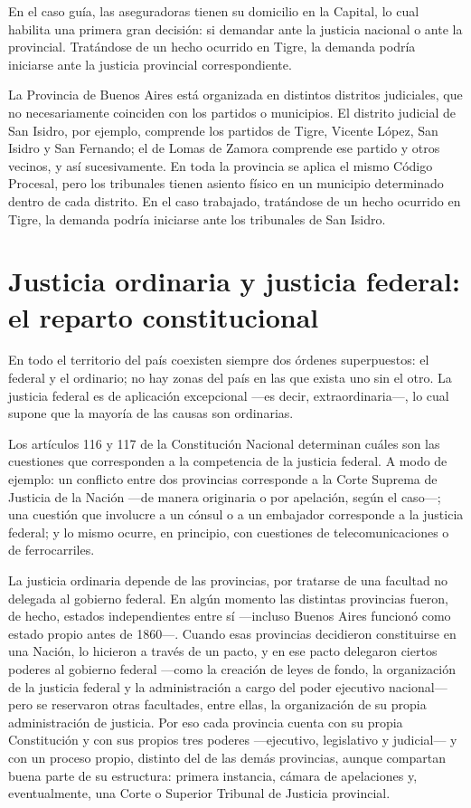 \documentclass[12pt,oneside]{book}
\begin{document}
En el caso guía, las aseguradoras tienen su domicilio en la Capital, lo cual habilita una primera gran decisión: si demandar ante la justicia nacional o ante la provincial. Tratándose de un hecho ocurrido en Tigre, la demanda podría iniciarse ante la justicia provincial correspondiente.

La Provincia de Buenos Aires está organizada en distintos distritos judiciales, que no necesariamente coinciden con los partidos o municipios. El distrito judicial de San Isidro, por ejemplo, comprende los partidos de Tigre, Vicente López, San Isidro y San Fernando; el de Lomas de Zamora comprende ese partido y otros vecinos, y así sucesivamente. En toda la provincia se aplica el mismo Código Procesal, pero los tribunales tienen asiento físico en un municipio determinado dentro de cada distrito. En el caso trabajado, tratándose de un hecho ocurrido en Tigre, la demanda podría iniciarse ante los tribunales de San Isidro.

\section{Justicia ordinaria y justicia federal: el reparto constitucional}

En todo el territorio del país coexisten siempre dos órdenes superpuestos: el federal y el ordinario; no hay zonas del país en las que exista uno sin el otro. La justicia federal es de aplicación excepcional —es decir, extraordinaria—, lo cual supone que la mayoría de las causas son ordinarias.

\begin{important}
Los artículos 116 y 117 de la Constitución Nacional determinan cuáles son las cuestiones que corresponden a la competencia de la justicia federal. A modo de ejemplo: un conflicto entre dos provincias corresponde a la Corte Suprema de Justicia de la Nación —de manera originaria o por apelación, según el caso—; una cuestión que involucre a un cónsul o a un embajador corresponde a la justicia federal; y lo mismo ocurre, en principio, con cuestiones de telecomunicaciones o de ferrocarriles.
\end{important}

La justicia ordinaria depende de las provincias, por tratarse de una facultad no delegada al gobierno federal. En algún momento las distintas provincias fueron, de hecho, estados independientes entre sí —incluso Buenos Aires funcionó como estado propio antes de 1860—. Cuando esas provincias decidieron constituirse en una Nación, lo hicieron a través de un pacto, y en ese pacto delegaron ciertos poderes al gobierno federal —como la creación de leyes de fondo, la organización de la justicia federal y la administración a cargo del poder ejecutivo nacional— pero se reservaron otras facultades, entre ellas, la organización de su propia administración de justicia. Por eso cada provincia cuenta con su propia Constitución y con sus propios tres poderes —ejecutivo, legislativo y judicial— y con un proceso propio, distinto del de las demás provincias, aunque compartan buena parte de su estructura: primera instancia, cámara de apelaciones y, eventualmente, una Corte o Superior Tribunal de Justicia provincial.
\end{document}
